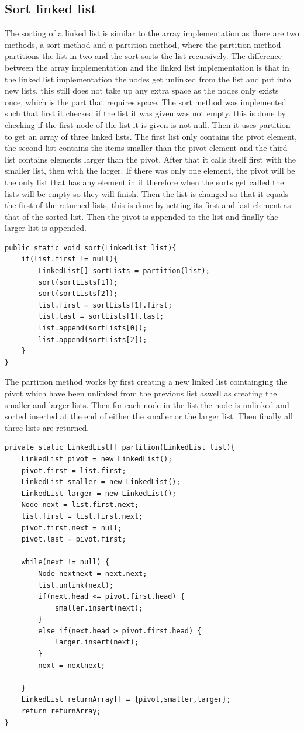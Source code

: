 \documentclass[a4paper,11pt]{article}
\begin{document}
\subsection*{Sort linked list}
The sorting of a linked list is similar to the array implementation as there are two methods, a sort method and a partition method, where the partition method partitions the list in two and the sort sorts the list recursively. 
The difference between the array implementation and the linked list implementation is that in the linked list implementation the nodes get unlinked from the list and put into new lists, this still does not take up 
any extra space as the nodes only exists once, which is the part that requires space.
\newline
The sort method was implemented such that first it checked if the list it was given was not empty, this is done by checking if the first node of the list it is given is not null. Then it uses partition to get an array of three linked lists. The first list only contains the pivot element, the second list contains the items smaller than the pivot element and the third 
list contains elements larger than the pivot. After that it calls itself first with the smaller list, then with the larger. If there was only one element, the pivot will be the only list that has any element in it therefore when the sorts get called the lists will be empty so they will finish. 
Then the list is changed so that it equals the first of the returned lists, this is done by setting its first and last element as that of the sorted list. Then the pivot is appended to the list and finally the larger list is appended.
\begin{verbatim}
public static void sort(LinkedList list){
    if(list.first != null){        
        LinkedList[] sortLists = partition(list);    
        sort(sortLists[1]);
        sort(sortLists[2]);
        list.first = sortLists[1].first;
        list.last = sortLists[1].last;
        list.append(sortLists[0]);
        list.append(sortLists[2]);
    }
}    
\end{verbatim}
The partition method works by first creating a new linked list cointainging the pivot which have been unlinked from the previous list aswell as creating the smaller and larger lists.
Then for each node in the list the node is unlinked and sorted inserted at the end of either the smaller or the larger list. 
Then finally all three lists are returned.
\begin{verbatim}
private static LinkedList[] partition(LinkedList list){
    LinkedList pivot = new LinkedList();
    pivot.first = list.first;
    LinkedList smaller = new LinkedList();
    LinkedList larger = new LinkedList();
    Node next = list.first.next;
    list.first = list.first.next;
    pivot.first.next = null;
    pivot.last = pivot.first;

    while(next != null) {
        Node nextnext = next.next;
        list.unlink(next);
        if(next.head <= pivot.first.head) {
            smaller.insert(next);
        }
        else if(next.head > pivot.first.head) {
            larger.insert(next);
        }
        next = nextnext;

    }
    LinkedList returnArray[] = {pivot,smaller,larger};
    return returnArray;
}
\end{verbatim}
\end{document}
